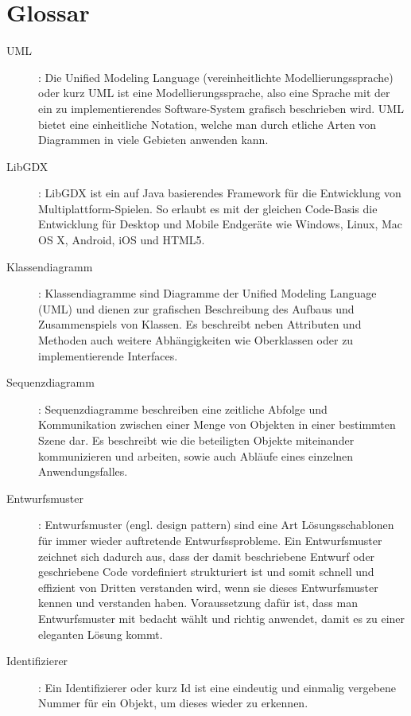 \section{Glossar}
\begin{description}
\item[UML]:
Die Unified Modeling Language (vereinheitlichte Modellierungssprache) oder kurz UML ist eine Modellierungssprache, also eine Sprache mit der ein zu implementierendes Software-System grafisch beschrieben wird.
UML bietet eine einheitliche Notation, welche man durch etliche Arten von Diagrammen in viele Gebieten anwenden kann.

\item[LibGDX]:
LibGDX ist ein auf Java basierendes Framework für die Entwicklung von Multiplattform-Spielen. So erlaubt es mit der gleichen Code-Basis die Entwicklung für Desktop und Mobile Endgeräte wie Windows, Linux, Mac OS X, Android, iOS und HTML5. 

\item[Klassendiagramm]:
Klassendiagramme sind Diagramme der Unified Modeling Language (UML) und dienen zur grafischen Beschreibung des Aufbaus und Zusammenspiels von Klassen.
Es beschreibt neben Attributen und Methoden auch weitere Abhängigkeiten wie Oberklassen oder zu implementierende Interfaces.

\item[Sequenzdiagramm]:
Sequenzdiagramme beschreiben eine zeitliche Abfolge und Kommunikation zwischen einer Menge von Objekten in einer bestimmten Szene dar. Es beschreibt wie die beteiligten Objekte miteinander kommunizieren und arbeiten, sowie auch Abläufe eines einzelnen Anwendungsfalles.

\item[Entwurfsmuster]: 
Entwurfsmuster (engl. design pattern) sind eine Art Lösungsschablonen für immer wieder auftretende Entwurfssprobleme. Ein Entwurfsmuster zeichnet sich dadurch aus, dass der damit beschriebene Entwurf oder geschriebene Code vordefiniert strukturiert ist und somit schnell und effizient von Dritten verstanden wird, wenn sie dieses Entwurfsmuster kennen und verstanden haben. Voraussetzung dafür ist, dass man Entwurfsmuster mit bedacht wählt und richtig anwendet, damit es zu einer eleganten Lösung kommt.

\item[Identifizierer]: 
Ein Identifizierer oder kurz Id ist eine eindeutig und einmalig vergebene Nummer für ein Objekt, um dieses wieder zu erkennen.


\end{description}